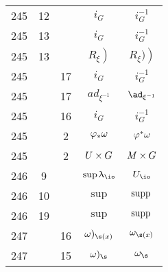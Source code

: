 \documentclass[a4paper,11pt]{article}
\begin{document}
\begin{center}
\begin{tabular}{|c|c|c|c|c|}
    245 & 12 & & $i_{ G }$ & $i_{ G }^{ -1 }$ \\
    245 & 13 & & $i_{ G }$ & $i_{ G }^{ -1 }$ \\
    245 & 13 & & $\left. R_{ \xi } \right)$ & $\left. R_{ \xi } ) \right)$ \\
    245 & & 17 & $i_{ G }$ & $i_{ G }^{ -1 }$ \\
    245 & & 17 & $ad_{ \xi^{ -1 } }$ & $\ad_{ \xi^{ -1 } }$ \\
    245 & & 16 & $i_{ G }$ & $i_{ G }^{ -1 }$ \\
    245 & &  2 & $\varphi_{ * } \omega$ & $\varphi^{ * } \omega$ \\
    245 & &  2 & $U \times G$ & $M \times G$ \\
    246 &  9 & & $\sup \la_{ \io }$ & $U_{ \io }$ \\
    246 & 10 & & $\sup$ & $\mathrm{supp}\,$ \\
    246 & 19 & & $\sup$ & $\mathrm{supp}\,$ \\
    247 & & 16 & $\om )_{ \s( x ) }$ & $\om_{ \s( x ) }$ \\
    247 & & 15 & $\om )_{ \s }$ & $\om_{ \s }$ \\
    \hline
  \end{tabular}


\end{center}
\end{document}
